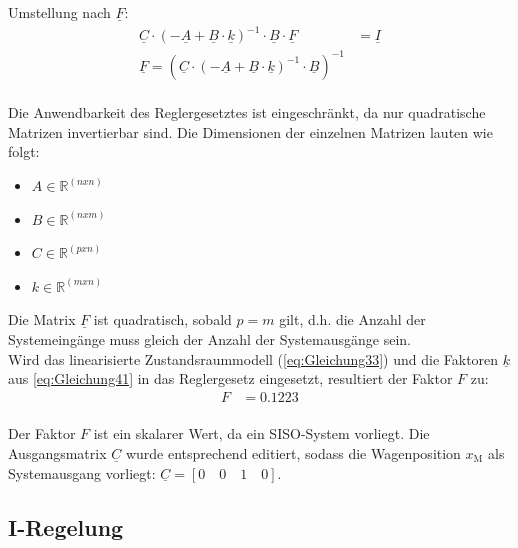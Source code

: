 \documentclass[
	pagesize,
	fontsize=12pt,
	paper=a4,
	oneside,
   reqno
]{scrartcl}
\begin{document}
Umstellung nach $\underline{F}$:
\begin{align}
    \underline{C}\cdot(-\underline{A}+\underline{B}\cdot{\underline{k}})^{-1}\cdot\underline{B}\cdot\underline{F} &= \underline{I} \label{eq:Gleichung54}\\
    \underline{F} = (\underline{C}\cdot(-\underline{A}+\underline{B}\cdot{\underline{k}})^{-1}\cdot\underline{B})^{-1} \label{eq:Gleichung55}
\end{align}\\
Die Anwendbarkeit des Reglergesetztes ist eingeschränkt, da nur quadratische Matrizen invertierbar sind. Die Dimensionen der einzelnen Matrizen lauten wie folgt:
\begin{itemize}
    \item $A\in\mathbb{R}^{(nxn)}$
    \item $B\in\mathbb{R}^{(nxm)}$
    \item $C\in\mathbb{R}^{(pxn)}$
    \item $k\in\mathbb{R}^{(mxn)}$
\end{itemize}
Die Matrix $\underline{F}$ ist quadratisch, sobald $p = m$ gilt, d.h. die Anzahl der Systemeingänge muss gleich der Anzahl der Systemausgänge sein.\\
Wird das linearisierte Zustandsraummodell (\autoref{eq:Gleichung33}) und die Faktoren $\underline{k}$ aus \autoref{eq:Gleichung41} in das Reglergesetz eingesetzt, resultiert der Faktor $F$ zu:\\
\begin{align}
    F &= 0.1223
\end{align}\\
Der Faktor $F$ ist ein skalarer Wert, da ein SISO-System vorliegt. Die Ausgangsmatrix $\underline{C}$ wurde entsprechend editiert, sodass die Wagenposition $x_{\mathrm{M}}$ als Systemausgang vorliegt: $\underline{C} = [0\quad0\quad1\quad0]$.

\subsection{I-Regelung}
\end{document}
